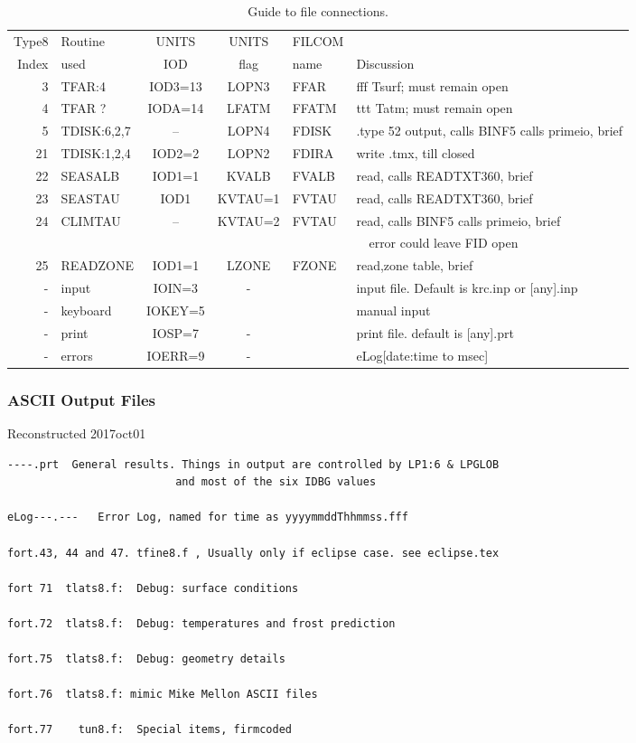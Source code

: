 \documentclass{article}
\begin{document}
\begin{table} 
\caption{Guide to file connections.}
\label{filecon.tab}
\begin{center} \begin{tabular}{ | r l c c l l | } \hline
Type8 & Routine & UNITS & UNITS & FILCOM &   \\
Index & used    & IOD  & flag & name   & Discussion \\  \hline
 3 & TFAR:4     & IOD3=13 & LOPN3 & FFAR & fff Tsurf; must remain open \\
 4 & TFAR ?      & IODA=14  & LFATM  & FFATM  & ttt Tatm;  must remain open \\
 5 & TDISK:6,2,7 & --  & LOPN4 & FDISK  & .type 52 output, calls BINF5 calls primeio, brief \\  
21 & TDISK:1,2,4 & IOD2=2  & LOPN2 & FDIRA & write .tmx, till closed \\
22 & SEASALB  & IOD1=1  & KVALB & FVALB & read, calls READTXT360, brief \\
23 & SEASTAU  & IOD1  & KVTAU=1 & FVTAU & read, calls READTXT360, brief \\
24 & CLIMTAU  & --    & KVTAU=2 & FVTAU & read, calls BINF5 calls primeio, brief \\  
   &          &     & &       & \ \  error could leave FID open \\
25 & READZONE & IOD1=1  &  LZONE & FZONE & read,zone table, brief  \\
- & input & IOIN=3 & - &  & input file. Default is krc.inp or [any].inp \\
- & keyboard & IOKEY=5 & & & manual input \\
- & print & IOSP=7 & - & & print file. default is [any].prt \\
- & errors & IOERR=9 & - &  & eLog[date:time to msec] \\ 
 \hline  \end{tabular} \end{center} \end{table}


\subsubsection{ASCII Output Files} %
Reconstructed  2017oct01
\vspace{-3.mm}
\begin{verbatim}
----.prt  General results. Things in output are controlled by LP1:6 & LPGLOB
                          and most of the six IDBG values

eLog---.---   Error Log, named for time as yyyymmddThhmmss.fff

fort.43, 44 and 47. tfine8.f , Usually only if eclipse case. see eclipse.tex 

fort 71  tlats8.f:  Debug: surface conditions

fort.72  tlats8.f:  Debug: temperatures and frost prediction

fort.75  tlats8.f:  Debug: geometry details

fort.76  tlats8.f: mimic Mike Mellon ASCII files

fort.77    tun8.f:  Special items, firmcoded

\end{verbatim}
\end{document}
